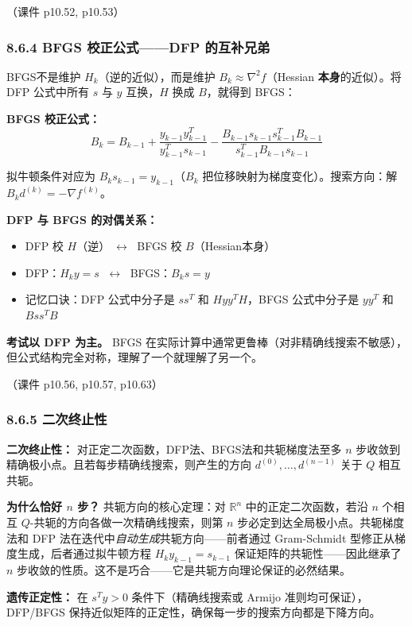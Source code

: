 （课件 p10.52, p10.53）

\subsubsection{8.6.4 BFGS 校正公式——DFP 的互补兄弟}

BFGS不是维护 $H_k$（逆的近似），而是维护 $B_k \approx \nabla^2 f$（Hessian \textbf{本身}的近似）。将 DFP 公式中所有 $s$ 与 $y$ 互换，$H$ 换成 $B$，就得到 BFGS：

\textbf{BFGS 校正公式：}
\[
B_k = B_{k-1}
    + \frac{y_{k-1} y_{k-1}^T}{y_{k-1}^T s_{k-1}}
    - \frac{B_{k-1} s_{k-1} s_{k-1}^T B_{k-1}}{s_{k-1}^T B_{k-1} s_{k-1}}
\]

拟牛顿条件对应为 $B_k s_{k-1} = y_{k-1}$（$B_k$ 把位移映射为梯度变化）。搜索方向：解 $B_k d^{(k)} = -\nabla f^{(k)}$。

\textbf{DFP 与 BFGS 的对偶关系：}
\begin{itemize}
  \item DFP 校 $H$（逆）$\;\longleftrightarrow\;$ BFGS 校 $B$（Hessian本身）
  \item DFP：$H_k y = s$ $\;\longleftrightarrow\;$ BFGS：$B_k s = y$
  \item 记忆口诀：DFP 公式中分子是 $ss^T$ 和 $Hyy^T H$，BFGS 公式中分子是 $yy^T$ 和 $Bss^T B$
\end{itemize}

\textbf{考试以 DFP 为主。} BFGS 在实际计算中通常更鲁棒（对非精确线搜索不敏感），但公式结构完全对称，理解了一个就理解了另一个。

（课件 p10.56, p10.57, p10.63）

\subsubsection{8.6.5 二次终止性}

\textbf{二次终止性：} 对正定二次函数，DFP法、BFGS法和共轭梯度法至多 $n$ 步收敛到精确极小点。且若每步精确线搜索，则产生的方向 $d^{(0)},\dots,d^{(n-1)}$ 关于 $Q$ 相互共轭。

\textbf{为什么恰好 $n$ 步？} 共轭方向的核心定理：对 $\mathbb{R}^n$ 中的正定二次函数，若沿 $n$ 个相互 $Q$-共轭的方向各做一次精确线搜索，则第 $n$ 步必定到达全局极小点。共轭梯度法和 DFP 法在迭代中\emph{自动生成}共轭方向——前者通过 Gram-Schmidt 型修正从梯度生成，后者通过拟牛顿方程 $H_k y_{k-1} = s_{k-1}$ 保证矩阵的共轭性——因此继承了 $n$ 步收敛的性质。这不是巧合——它是共轭方向理论保证的必然结果。

\textbf{遗传正定性：} 在 $s^Ty > 0$ 条件下（精确线搜索或 Armijo 准则均可保证），DFP/BFGS 保持近似矩阵的正定性，确保每一步的搜索方向都是下降方向。

